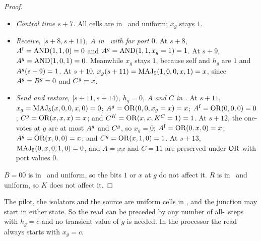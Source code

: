 \begin{proof}
\begin{itemize}
  in \LOAD, destination $C=11$ in \RESET, and far destination port $x_g$, which stays $1$ because
  its self, $\ep Ag$ and $h_g$ are $1$. The source's far port is $\ep RK=x$. The result is $K=11$,
  $C=xx$, as listed.
\item \emph{Control time $s+7$.} All cells are in \HOLD\ and uniform; $x_g$ stays $1$.
\item \emph{Receive, $[s+8,s+11)$, $A$ in \RESET\ with far port $0$.} At $s+8$,
  $A^{\mathrm f}=\operatorname{AND}(1,1,0)=0$ and $A^{g}=\operatorname{AND}(1,1,x_g=1)=1$. At $s+9$, $A^{g}=\operatorname{AND}(1,0,1)=0$.
  Meanwhile $x_g$ stays $1$, because self and $h_g$ are $1$ and $A^{g}(s+9)=1$. At $s+10$,
  $x_g(s+11)=\operatorname{MAJ}_5(1,0,0,x,1)=x$, since $A^{g}=B^{g}=0$ and $C^{g}=x$.
\item \emph{Send and restore, $[s+11,s+14)$, $h_g=0$, $A$ and $C$ in \LOAD.} At $s+11$,
  $x_g=\operatorname{MAJ}_5(x,0,0,x,0)=0$; $A^{g}=\operatorname{OR}(0,0,x_g=x)=x$; $A^{\mathrm f}=\operatorname{OR}(0,0,0)=0$;
  $C^{g}=\operatorname{OR}(x,x,x)=x$; and $C^{K}=\operatorname{OR}(x,x,K^{C}=1)=1$. At $s+12$, the one-votes at $g$ are at
  most $\ep Ag$ and $C^{g}$, so $x_g=0$; $A^{\mathrm f}=\operatorname{OR}(0,x,0)=x$; $A^{g}=\operatorname{OR}(x,0,0)=x$; and
  $C^{g}=\operatorname{OR}(x,1,0)=1$. At $s+13$, $\operatorname{MAJ}_5(0,x,0,1,0)=0$, and $A=xx$ and $C=11$ are preserved under
  $\operatorname{OR}$ with port values $0$.
\end{itemize}
$B=00$ is in \HOLD\ and uniform, so the bits $1$ or $x$ at $g$ do not affect it. $R$ is in \HOLD\ and
uniform, so $K$ does not affect it.
\end{proof}

\begin{remark}\label{rem:readwait}
The pilot, the isolators and the source are uniform cells in \HOLD, and the junction may start in
either state. So the read can be preceded by any number of all-\HOLD\ steps with $h_g=c$ and no
transient value of $g$ is needed. In the processor the read always starts with $x_g=c$.
\end{remark}

